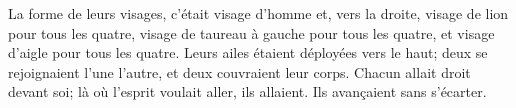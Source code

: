 La forme de leurs visages, c’était visage d’homme
	et, vers la droite, visage de lion pour tous les quatre,
	visage de taureau à gauche pour tous les quatre,
	et visage d’aigle pour tous les quatre.
Leurs ailes étaient déployées vers le haut;
	deux se rejoignaient l’une l’autre, et deux couvraient leur corps.
Chacun allait droit devant soi; là où l’esprit voulait aller, ils allaient.
	Ils avançaient sans s’écarter.
